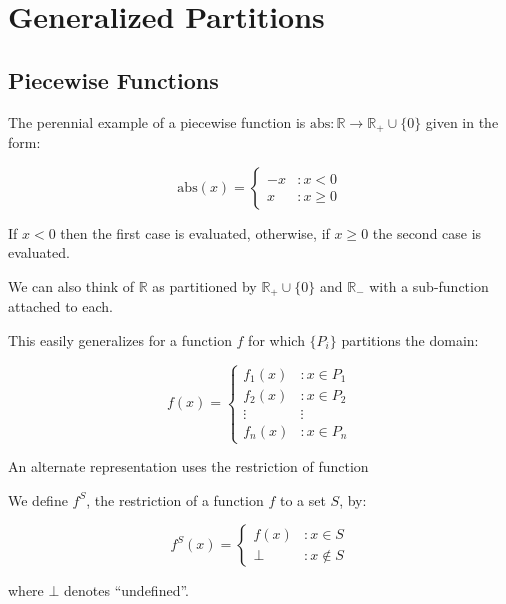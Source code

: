 \chapter{Generalized Partitions}
\section{Piecewise Functions}
\doublespacing

The perennial example of a piecewise function is $\mathrm{abs}:\mathbb{R} \to \mathbb{R}_{+} \cup \{ 0 \}$ given in the form:

\begin{equation}
\mathrm{abs}(x) = 
  \left\{
     \begin{array}{lr}
       -x & : x < 0 \\
       x & : x \geq 0
     \end{array}
   \right.
\end{equation}

If $x < 0$ then the first case is evaluated, otherwise, if $x \geq 0$ the second case is evaluated.

We can also think of $\mathbb{R}$ as partitioned by $\mathbb{R}_{+} \cup \{ 0 \} $ and $\mathbb{R}_{-}$ with a sub-function attached to each.

This easily generalizes for a function $f$ for which $\{ P_i \}$ partitions the domain:

\begin{equation}
f(x) = 
  \left\{
     \begin{array}{lr}
       f_1(x) & : x \in P_1 \\
       f_2(x) & : x \in P_2 \\ 
       \vdots & \vdots \\
       f_n(x) & : x \in P_n
     \end{array}
   \right.
\end{equation}

An alternate representation uses the restriction of function

\begin{definition}
We define $f^S$, the restriction of a function $f$ to a set $S$, by:

\begin{equation}
f^S(x) = 
  \left\{
     \begin{array}{lr}
       f(x) & : x \in S \\
       \bot & : x \notin S
     \end{array}
   \right.
\label{eq_fP}
\end{equation}

where $\bot$ denotes ``undefined''.
\end{definition}

